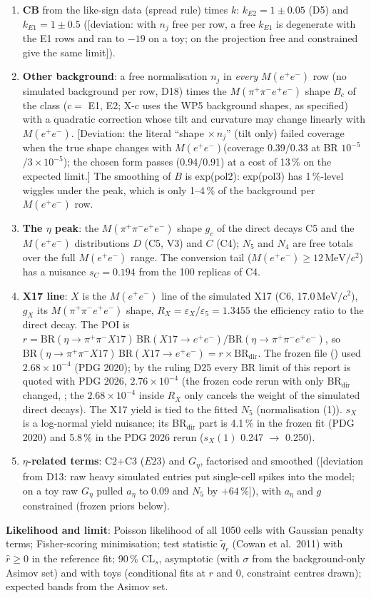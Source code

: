 \documentclass[11pt,a4paper]{article}
\newcommand{\ee}{\ensuremath{e^{+}e^{-}}\xspace}
\newcommand{\pipi}{\ensuremath{\pi^{+}\pi^{-}}\xspace}
\newcommand{\ppee}{\ensuremath{\pi^{+}\pi^{-}e^{+}e^{-}}\xspace}
\newcommand{\Mfour}{\ensuremath{M(\pi^{+}\pi^{-}e^{+}e^{-})}\xspace}
\newcommand{\Mee}{\ensuremath{M(e^{+}e^{-})}\xspace}
\newcommand{\MeVcc}{\ensuremath{\mathrm{MeV}/c^{2}}\xspace}
\newcommand{\code}[1]{\texttt{\detokenize{#1}}}
\newcommand{\aEta}{\ensuremath{a_\eta}\xspace}
\newcommand{\kEone}{\ensuremath{k_{E1}}\xspace}
\newcommand{\kEtwo}{\ensuremath{k_{E2}}\xspace}
\newcommand{\Geta}{\ensuremath{G_\eta}\xspace}
\newcommand{\BRX}{\ensuremath{\mathrm{BR}(\eta\to\pipi X17)\,\mathrm{BR}(X17\to\ee)}\xspace}
\newcommand{\flag}[1]{\textcolor{red!60!black}{[#1]}}
\begin{document}
\begin{enumerate}\setlength{\itemsep}{0pt}
\item \textbf{CB} from the like-sign data (spread rule) times $k$: $\kEtwo=1\pm0.05$ (D5) and $\kEone=1\pm0.5$ (\flag{deviation: with $n_j$ free per
      row, a free \kEone is degenerate with the E1 rows and ran to $-19$ on a toy; on the projection free and constrained give the same limit}).
\item \textbf{Other background}: a free normalisation $n_j$ in \emph{every} \Mee row (no simulated background per row, D18) times the \Mfour shape
      $B_c$ of the class ($c=$ E1, E2; X-c uses the WP5 background shapes, as specified) with a quadratic correction whose tilt and curvature may
      change linearly with \Mee. \flag{Deviation: the literal ``shape $\times\,n_j$'' (tilt only) failed coverage when the true shape changes with
      \Mee (coverage 0.39/0.33 at BR $10^{-5}$/$3\times10^{-5}$); the chosen form passes (0.94/0.91) at a cost of 13\,\% on the expected limit.}
      The smoothing of $B$ is exp(pol2): exp(pol3) has 1\,\%-level wiggles under the peak, which is only 1--4\,\% of the background per \Mee row.
\item \textbf{The $\eta$ peak}: the \Mfour shape $g_c$ of the direct decays C5 and the \Mee distributions $D$ (C5, V3) and $C$ (C4); $N_5$ and $N_4$ are
      free totals over the full \Mee range. The conversion tail (\Mee$\ge12$\,\MeVcc) has a nuisance $s_C=0.194$ from the 100 replicas of C4.
\item \textbf{X17 line}: $X$ is the \Mee line of the simulated X17 (C6, 17.0\,\MeVcc), $g_X$ its \Mfour shape, $R_X=\varepsilon_X/\varepsilon_5=1.3455$
      the efficiency ratio to the direct decay. The POI is $r=\BRX/\mathrm{BR}(\eta\to\ppee)$, so $\BRX=r\times\mathrm{BR}_{\mathrm{dir}}$. The frozen file (\code{x17_frozen.txt}) used $2.68\times10^{-4}$ (PDG 2020); by the ruling D25 every
      BR limit of this report is quoted with PDG 2026, $2.76\times10^{-4}$ (the frozen code rerun with only BR$_{\mathrm{dir}}$ changed,
      \code{x17p26_limit.C}; the $2.68\times10^{-4}$ inside $R_X$ only cancels the weight of the simulated direct decays). The X17 yield is tied
      to the fitted $N_5$ (normalisation (1)). $s_X$ is a log-normal yield nuisance; its BR$_{\mathrm{dir}}$ part is 4.1\,\% in the frozen fit
      (PDG 2020) and 5.8\,\% in the PDG 2026 rerun ($s_X(1)$ 0.247 $\to$ 0.250).
\item \textbf{$\eta$-related terms}: C2+C3 ($E23$) and \Geta, factorised and smoothed (\flag{deviation from D13: raw heavy simulated entries put single-cell spikes
      into the model; on a toy raw \Geta pulled \aEta to 0.09 and $N_5$ by $+64$\,\%}), with \aEta and $g$ constrained (frozen priors below).
\end{enumerate}
\textbf{Likelihood and limit}: Poisson likelihood of all 1050 cells with Gaussian penalty terms; Fisher-scoring minimisation; test statistic
$\tilde q_r$ (Cowan et al.\ 2011) with $\hat r\ge0$ in the reference fit; 90\,\% CL$_s$, asymptotic (with $\sigma$ from the background-only Asimov set)
and with toys (conditional fits at $r$ and 0, constraint centres drawn); expected bands from the Asimov set.
\end{document}
